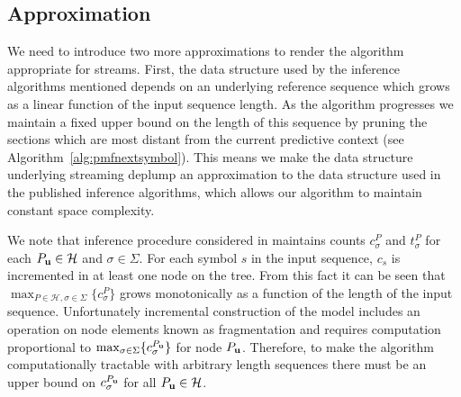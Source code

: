 %
\subsection{Approximation}

We need to introduce two more approximations to render the algorithm appropriate for streams.  First, the data structure used by the inference algorithms mentioned depends on an underlying reference sequence which grows as a linear function of the input sequence length.  As the algorithm progresses we maintain a fixed upper bound on the length of this sequence by pruning the sections which are most distant from the current predictive context (see Algorithm~\ref{alg:pmfnextsymbol}).  This means we make the data structure underlying streaming deplump an approximation to the data structure used in the published inference algorithms, which allows our algorithm to maintain constant space complexity.

We note that inference procedure considered in \cite{Gasthaus2011} maintains counts $c^P_\sigma$ and $t^P_\sigma$ for each $P_{\bf u} \in \mathcal{H}$ and $\sigma \in \Sigma$.  For each symbol $s$ in the input sequence, $c_{s}$ is incremented in at least one node on the tree.  From this fact it can be seen that $\max_{P \in \mathcal{H}, \sigma \in \Sigma} \{ c^{P}_{\sigma} \}$ grows monotonically as a function of the length of the input sequence. Unfortunately incremental construction of the model includes an operation on node elements known as fragmentation and requires computation proportional to $\max_{\sigma \in \Sigma} \{ c_{\sigma}^{P_{\bf u}} \}$ for node $P_{\bf u}$\citep{Gasthaus2011}. Therefore, to make the algorithm computationally tractable with arbitrary length sequences there must be an upper bound on $c^{P_{\bf u}}_\sigma$ for all $P_{\bf u} \in \mathcal{H}$.  

